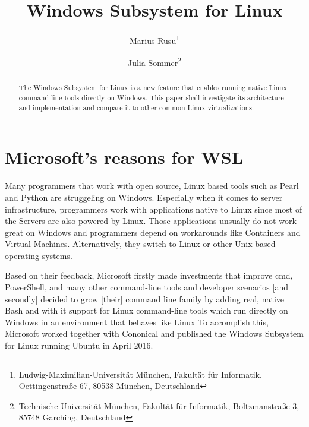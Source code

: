 \documentclass[utf8,biblatex, ngerman, english]{lni}
\begin{document}
\title[WSL]{Windows Subsystem for Linux}
\author[Marius Rusu \and Julia Sommer]
{Marius Rusu\footnote{Ludwig-Maximilian-Universität München, Fakultät für Informatik, Oettingenstraße 67, 80538 München, Deutschland } \and
 Julia Sommer\footnote{Technische Universität München, Fakultät für Informatik, Boltzmanstraße 3, 85748 Garching, Deutschland }}
\maketitle
\newpage
\tableofcontents
\newpage

\begin{abstract}
The Windows Subsystem for Linux is a new feature that enables running native Linux command-line tools directly on Windows. This paper shall investigate its architecture and implementation and compare it to other common Linux virtualizations.
\end{abstract}


\section{Microsoft's reasons for WSL}

Many programmers that work with open source, Linux based tools such as Pearl and Python are struggeling on Windows. Especially when it comes to server infrastructure, programmers work with applications native to Linux since most of the Servers are also powered by Linux. Those applications unsually do not work great on Windows and programmers depend on workarounds like Containers and Virtual Machines. Alternatively, they switch to Linux or other Unix based operating systems. \cite{Mi16}

Based on their feedback, Microsoft firstly made investments that improve cmd, PowerShell, and many other command-line tools and developer scenarios [and secondly] decided to grow [their] command line family by adding real, native Bash and with it support for Linux command-line tools which run directly on Windows in an environment that behaves like Linux \cite{Mi16}
To accomplish this, Microsoft worked together with Cononical and published the Windows Subsystem for Linux running Ubuntu in April 2016. \cite{Mi16}
\end{document}
